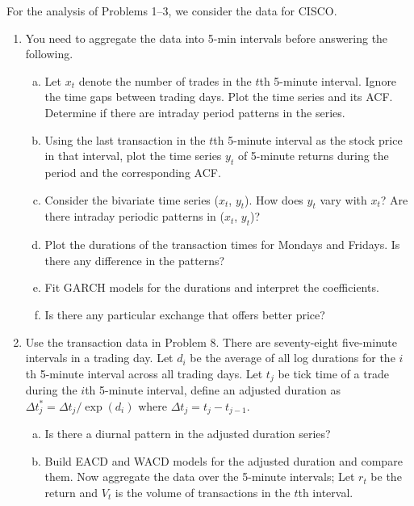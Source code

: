 For the analysis of Problems 1--3, we consider the data for CISCO.

\begin{enumerate}[1.]
 
\item You need to aggregate the data into 5-min intervals before answering the following.
\begin{enumerate}[(a)]
\item Let $x_t$ denote the number of trades in the $t$th 5-minute interval. Ignore the time gaps between trading days. Plot the time series and its ACF. Determine if there are intraday period patterns in the series.

\item Using the last transaction in the $t$th 5-minute interval as the stock price in that interval, plot the
time series $y_t$ of 5-minute returns during the period and the corresponding ACF.

\item Consider the bivariate time series ($x_t$, $y_t$). How does $y_t$ vary with $x_t$? Are there intraday periodic patterns in ($x_t$, $y_t$)?

\item Plot the durations of the transaction times for Mondays and Fridays. Is there any difference in the
patterns?

\item Fit GARCH models for the durations and interpret the coefficients.

\item Is there any particular exchange that offers better price?
\end{enumerate}



\item Use the transaction data in Problem 8. There are seventy-eight five-minute intervals in a trading day. Let $d_i$ be the average of all log durations for the $i$th 5-minute interval across all trading days. Let $t_j$ be tick time of a trade during the $i$th 5-minute interval, define an adjusted duration as $\Delta t_j^* = \Delta t_j/\exp(d_i)$ where $\Delta t_j = t_j - t_{j-1}$.
\begin{enumerate}[(a)]
\item Is there a diurnal pattern in the adjusted duration series?

\item Build EACD and WACD models for the adjusted duration and compare them. Now aggregate the data over the 5-minute intervals; Let $r_t$ be the return and $V_t$ is the volume of transactions in the $t$th interval.


\end{enumerate}
\end{enumerate}
